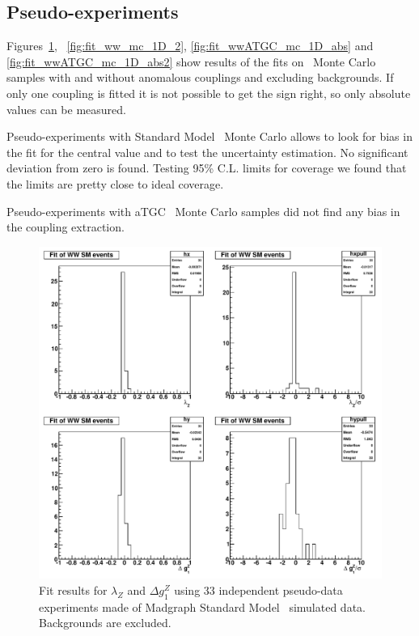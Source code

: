 \subsection{Pseudo-experiments}
Figures~\ref{fig:fit_ww_mc_1D},
~\ref{fig:fit_ww_mc_1D_2}, \ref{fig:fit_wwATGC_mc_1D_abs} and
\ref{fig:fit_wwATGC_mc_1D_abs2} show results of the fits on \ww\ Monte
Carlo samples with and without anomalous couplings and excluding
backgrounds. If only one coupling is fitted
it is not possible to get the sign right, so only absolute
values can be measured.

Pseudo-experiments with Standard Model \ww\ Monte Carlo allows to look
for bias in the fit for the central value and to test the uncertainty
estimation. No significant deviation from zero is found. Testing 95\%
C.L. limits for coverage we found that the limits are pretty close to
ideal coverage.


Pseudo-experiments with aTGC \ww\ Monte Carlo samples did not find any
bias in the coupling extraction. 

\begin{figure}[tp]
  \centerline{
    \includegraphics[width=1.0\textwidth]{figures/fit_ww_mc_1D}
  }

  \caption[1D fits to WW SM Monte Carlo] {Fit results for
  $\lambda_{Z}$ and $\Delta g^Z_1$ using 33 independent pseudo-data
  experiments made of Madgraph Standard Model \ww\ simulated
  data. Backgrounds are excluded.}

\label{fig:fit_ww_mc_1D}
\end{figure}

